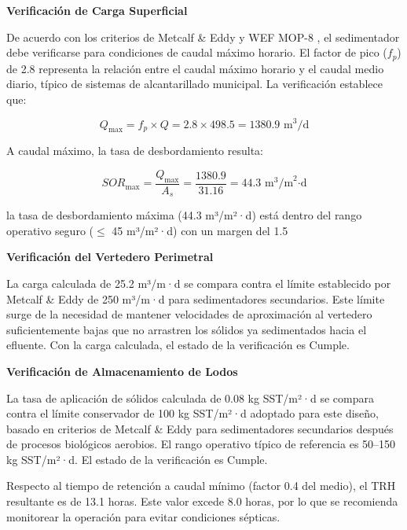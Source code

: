 \documentclass[12pt,a4paper]{article}
\begin{document}
\textbf{Verificación de Carga Superficial}

De acuerdo con los criterios de Metcalf \& Eddy \cite{metcalf2014} y WEF MOP-8 \cite{wef_mop8_2010}, el sedimentador debe verificarse para condiciones de caudal máximo horario. El factor de pico ($f_p$) de 2.8 representa la relación entre el caudal máximo horario y el caudal medio diario, típico de sistemas de alcantarillado municipal. La verificación establece que:

\begin{equation}
Q_{\max} = f_p \times Q = 2.8 \times 498.5 = 1380.9 \text{ m}^3\text{/d}
\end{equation}

A caudal máximo, la tasa de desbordamiento resulta:

\begin{equation}
SOR_{\max} = \frac{Q_{\max}}{A_s} = \frac{1380.9}{31.16} = 44.3 \text{ m}^3\text{/m}^2\text{·d}
\end{equation}

la tasa de desbordamiento máxima (44.3 m³/m²·d) está dentro del rango operativo seguro ($\leq$ 45 m³/m²·d) con un margen del 1.5%

\textbf{Verificación del Vertedero Perimetral}

La carga calculada de 25.2 m³/m·d se compara contra el límite establecido por Metcalf & Eddy de 250 m³/m·d para sedimentadores secundarios. Este límite surge de la necesidad de mantener velocidades de aproximación al vertedero suficientemente bajas que no arrastren los sólidos ya sedimentados hacia el efluente. Con la carga calculada, el estado de la verificación es Cumple.

\textbf{Verificación de Almacenamiento de Lodos}

La tasa de aplicación de sólidos calculada de 0.08 kg SST/m²·d se compara contra el límite conservador de 100 kg SST/m²·d adoptado para este diseño, basado en criterios de Metcalf & Eddy para sedimentadores secundarios después de procesos biológicos aerobios. El rango operativo típico de referencia es 50--150 kg SST/m²·d. El estado de la verificación es Cumple.

Respecto al tiempo de retención a caudal mínimo (factor 0.4 del medio), el TRH resultante es de 13.1 horas. Este valor excede 8.0 horas, por lo que se recomienda monitorear la operación para evitar condiciones sépticas.
\end{document}
